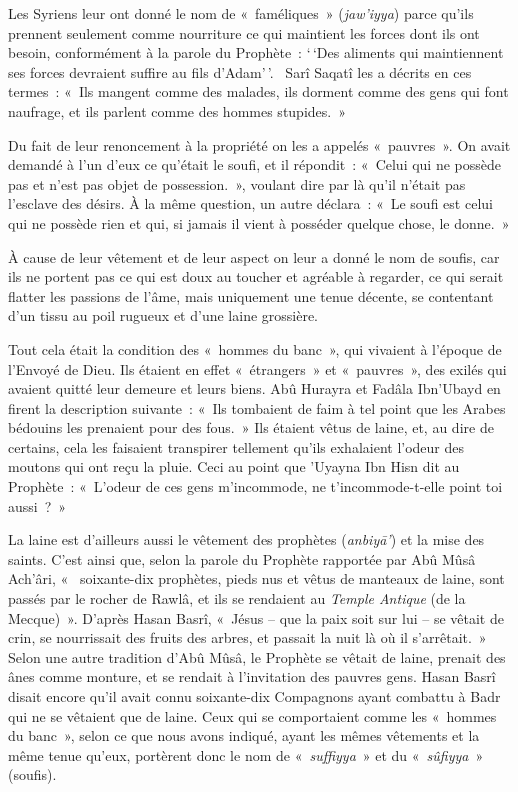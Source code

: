 Les Syriens leur ont donné le nom de «~faméliques~» (\emph{jaw'iyya})
parce qu'ils prennent seulement comme nourriture ce qui maintient les
forces dont ils ont besoin, conformément à la parole du Prophète~:
`\,`Des aliments qui maintiennent ses forces devraient suffire au fils
d'Adam'\,'.~ Sarî Saqatî les a décrits en ces termes~: «~Ils mangent
comme des malades, ils dorment comme des gens qui font naufrage, et ils
parlent comme des hommes stupides.~»

Du fait de leur renoncement à la propriété on les a appelés «~pauvres~».
On avait demandé à l'un d'eux ce qu'était le soufi, et il répondit~:
«~Celui qui ne possède pas et n'est pas objet de possession.~», voulant
dire par là qu'il n'était pas l'esclave des désirs. À la même question,
un autre déclara~: «~Le soufi est celui qui ne possède rien et qui, si
jamais il vient à posséder quelque chose, le donne.~»

À cause de leur vêtement et de leur aspect on leur a donné le nom de
soufis, car ils ne portent pas ce qui est doux au toucher et agréable à
regarder, ce qui serait flatter les passions de l'âme, mais uniquement
une tenue décente, se contentant d'un tissu au poil rugueux et d'une
laine grossière.

Tout cela était la condition des «~hommes du banc~», qui vivaient à
l'époque de l'Envoyé de Dieu. Ils étaient en effet «~étrangers~» et
«~pauvres~», des exilés qui avaient quitté leur demeure et leurs biens.
Abû Hurayra et Fadâla Ibn'Ubayd en firent la description suivante~:
«~Ils tombaient de faim à tel point que les Arabes bédouins les
prenaient pour des fous.~» Ils étaient vêtus de laine, et, au dire de
certains, cela les faisaient transpirer tellement qu'ils exhalaient
l'odeur des moutons qui ont reçu la pluie. Ceci au point que 'Uyayna Ibn
Hisn dit au Prophète~: «~L'odeur de ces gens m'incommode, ne
t'incommode-t-elle point toi aussi~?~»

La laine est d'ailleurs aussi le vêtement des prophètes (\emph{anbiyā'})
et la mise des saints. C'est ainsi que, selon la parole du Prophète
rapportée par Abû Mûsâ Ach'âri, «~ soixante-dix prophètes, pieds nus et
vêtus de manteaux de laine, sont passés par le rocher de Rawlâ, et ils
se rendaient au \emph{Temple Antique} (de la Mecque)~». D'après Hasan
Basrî, «~Jésus -- que la paix soit sur lui -- se vêtait de crin, se
nourrissait des fruits des arbres, et passait la nuit là où il
s'arrêtait.~» Selon une autre tradition d'Abû Mûsâ, le Prophète se
vêtait de laine, prenait des ânes comme monture, et se rendait à
l'invitation des pauvres gens. Hasan Basrî disait encore qu'il avait
connu soixante-dix Compagnons ayant combattu à Badr qui ne se vêtaient
que de laine. Ceux qui se comportaient comme les «~hommes du banc~»,
selon ce que nous avons indiqué, ayant les mêmes vêtements et la même
tenue qu'eux, portèrent donc le nom de «~\emph{suffiyya}~» et du
«~\emph{sûfiyya}~» (soufis).

